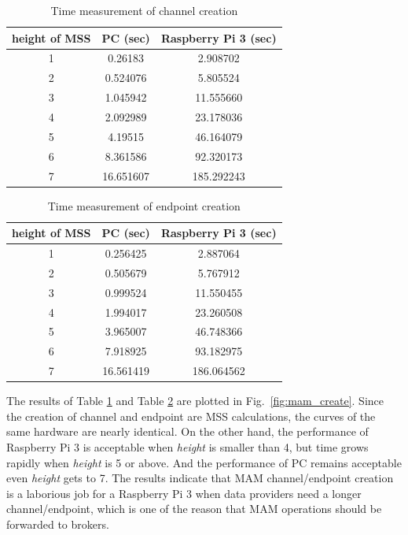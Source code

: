 \begin{spacing}{2.0}
\begin{table}[htbp]
	\caption{Time measurement of channel creation}
	\label{tab:channel_create}
	\begin{center}
	\begin{tabular}{|c|c|c|}
	\hline
		\textbf{height of MSS} & \textbf{PC (sec)} & \textbf{Raspberry Pi 3 (sec)} \\ 
		\hline
		1 & 0.26183 & 2.908702 \\ 
		2 & 0.524076 & 5.805524 \\ 
		3 & 1.045942 & 11.555660 \\ 
		4 & 2.092989 & 23.178036 \\ 
		5 & 4.19515 & 46.164079\\ 
		6 & 8.361586 & 92.320173\\ 
		7 & 16.651607 & 185.292243\\
		\hline
	\end{tabular}
	\end{center}
\end{table}

\begin{table}[htbp]
	\caption{Time measurement of endpoint creation}
	\label{tab:endpoint_create}
	\begin{center}
	\begin{tabular}{|c|c|c|}
	\hline
		\textbf{height of MSS} & \textbf{PC (sec)} & \textbf{Raspberry Pi 3 (sec)} \\ 
		\hline
		1 & 0.256425 & 2.887064 \\ 
		2 & 0.505679 & 5.767912 \\ 
		3 & 0.999524 & 11.550455 \\ 
		4 & 1.994017 & 23.260508 \\ 
		5 & 3.965007 & 46.748366 \\ 
		6 & 7.918925 & 93.182975 \\ 
		7 & 16.561419 & 186.064562 \\
		\hline
	\end{tabular}
	\end{center}
\end{table}

The results of Table \ref{tab:channel_create} and Table \ref{tab:endpoint_create} are plotted in Fig.~\ref{fig:mam_create}. Since the creation of channel and endpoint are MSS calculations, the curves of the same hardware are nearly identical. On the other hand, the performance of Raspberry Pi 3 is acceptable when \textit{height} is smaller than 4, but time grows rapidly when \textit{height} is 5 or above. And the performance of PC remains acceptable even \textit{height} gets to 7. The results indicate that MAM channel/endpoint creation is a laborious job for a Raspberry Pi 3 when data providers need a longer channel/endpoint, which is one of the reason that MAM operations should be forwarded to brokers.


\end{spacing}
